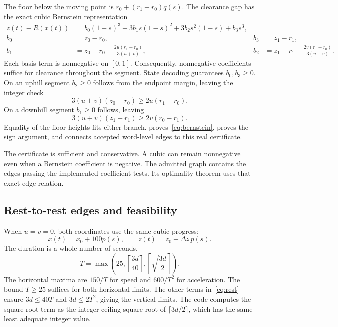 \documentclass[11pt]{article}
\begin{document}
The floor below the moving point is $r_0+(r_1-r_0)q(s)$.  The clearance gap has the exact cubic Bernstein representation
\begin{align}
 z(t)-R(x(t))
 &=b_0(1-s)^3+3b_1s(1-s)^2+3b_2s^2(1-s)+b_3s^3,\label{eq:bernstein}\\
 b_0&=z_0-r_0,& b_3&=z_1-r_1,\nonumber\\
 b_1&=z_0-r_0-\frac{2u(r_1-r_0)}{3(u+v)},&
 b_2&=z_1-r_1+\frac{2v(r_1-r_0)}{3(u+v)}.\nonumber
\end{align}
Each basis term is nonnegative on $[0,1]$.  Consequently, nonnegative coefficients suffice for clearance throughout the segment.  State decoding guarantees $b_0,b_3\geq0$.  On an uphill segment $b_2\geq0$ follows from the endpoint margin, leaving the integer check
\[
 3(u+v)(z_0-r_0)\geq2u(r_1-r_0).
\]
On a downhill segment $b_1\geq0$ follows, leaving
\[
 3(u+v)(z_1-r_1)\geq2v(r_0-r_1).
\]
Equality of the floor heights fits either branch.   proves~\eqref{eq:bernstein},  proves the sign argument, and  connects accepted word-level edges to this real certificate.

The certificate is sufficient and conservative.  A cubic can remain nonnegative even when a Bernstein coefficient is negative.  The admitted graph contains the edges passing the implemented coefficient tests.  Its optimality theorem uses that exact edge relation.

\subsection{Rest-to-rest edges and feasibility}

When $u=v=0$, both coordinates use the same cubic progress:
\[
 x(t)=x_0+100p(s),\qquad z(t)=z_0+\Delta z\,p(s).
\]
The duration is a whole number of seconds,
\begin{equation}
 T=\max\left(25,\left\lceil\frac{3d}{40}\right\rceil,
                    \left\lceil\sqrt{\frac{3d}{2}}\right\rceil\right).
 \label{eq:rest}
\end{equation}
The horizontal maxima are $150/T$ for speed and $600/T^2$ for acceleration.  The bound $T\geq25$ suffices for both horizontal limits.  The other terms in~\eqref{eq:rest} ensure $3d\leq40T$ and $3d\leq2T^2$, giving the vertical limits.  The code computes the square-root term as the integer ceiling square root of $\lceil3d/2\rceil$, which has the same least adequate integer value.
\end{document}
